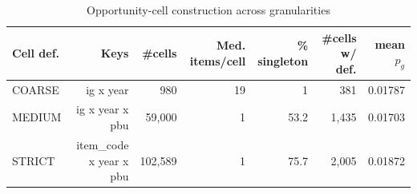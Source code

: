 \begin{table}[htbp]\centering
\caption{Opportunity-cell construction across granularities}
\label{tab:opp_cell_construction}
\begin{tabular}{lrrrrrr}\hline
Cell def. & Keys & \#cells & Med. items/cell & \% singleton & \#cells w/ def. & mean $p_g$ \\\hline
COARSE & ig x year &     980 & 19 & 1 &   381 & 0.01787 \\
MEDIUM & ig x year x pbu &  59,000 & 1 & 53.2 & 1,435 & 0.01703 \\
STRICT & item\_code x year x pbu & 102,589 & 1 & 75.7 & 2,005 & 0.01872 \\
\hline\end{tabular}\end{table}
